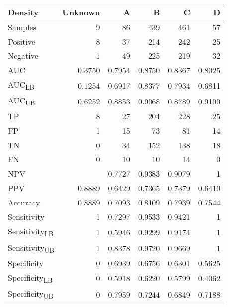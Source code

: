 \begin{tabular}{lrrrrr}
\toprule
Density & Unknown & A & B & C & D \\
\midrule
Samples & 9 & 86 & 439 & 461 & 57 \\
Positive & 8 & 37 & 214 & 242 & 25 \\
Negative & 1 & 49 & 225 & 219 & 32 \\
AUC & 0.3750 & 0.7954 & 0.8750 & 0.8367 & 0.8025 \\
AUC\textsubscript{LB} & 0.1254 & 0.6917 & 0.8377 & 0.7934 & 0.6811 \\
AUC\textsubscript{UB} & 0.6252 & 0.8853 & 0.9068 & 0.8789 & 0.9100 \\
TP & 8 & 27 & 204 & 228 & 25 \\
FP & 1 & 15 & 73 & 81 & 14 \\
TN & 0 & 34 & 152 & 138 & 18 \\
FN & 0 & 10 & 10 & 14 & 0 \\
NPV &  & 0.7727 & 0.9383 & 0.9079 & 1 \\
PPV & 0.8889 & 0.6429 & 0.7365 & 0.7379 & 0.6410 \\
Accuracy & 0.8889 & 0.7093 & 0.8109 & 0.7939 & 0.7544 \\
Sensitivity & 1 & 0.7297 & 0.9533 & 0.9421 & 1 \\
Sensitivity\textsubscript{LB} & 1 & 0.5946 & 0.9299 & 0.9174 & 1 \\
Sensitivity\textsubscript{UB} & 1 & 0.8378 & 0.9720 & 0.9669 & 1 \\
Specificity & 0 & 0.6939 & 0.6756 & 0.6301 & 0.5625 \\
Specificity\textsubscript{LB} & 0 & 0.5918 & 0.6220 & 0.5799 & 0.4062 \\
Specificity\textsubscript{UB} & 0 & 0.7959 & 0.7244 & 0.6849 & 0.7188 \\
\bottomrule
\end{tabular}
